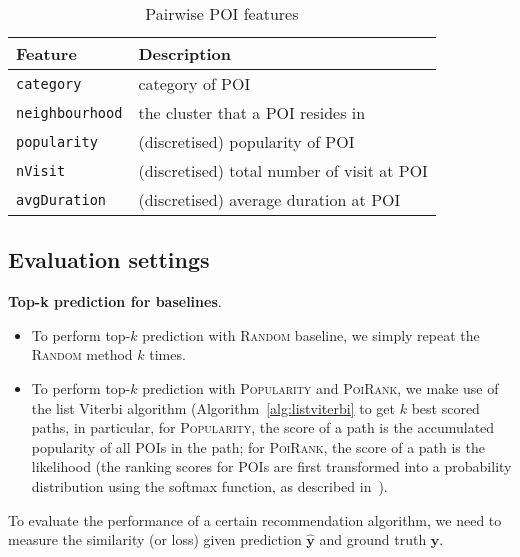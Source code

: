 \begin{table}[!h]
\caption{Pairwise POI features}
\label{tab:tranfeature}
\centering
\small
\setlength{\tabcolsep}{2pt} %
\begin{tabular}{l|l} \hline
\textbf{Feature}       & \textbf{Description} \\ \hline
\texttt{category}      & category of POI \\
\texttt{neighbourhood} & the cluster that a POI resides in \\
\texttt{popularity}    & (discretised) popularity of POI \\
\texttt{nVisit}        & (discretised) total number of visit at POI \\
\texttt{avgDuration}  & (discretised) average duration at POI \\ \hline
\end{tabular}
\end{table}


\clearpage
\subsection{Evaluation settings}
\label{sec:metric}

\textbf{Top-k prediction for baselines}.
\begin{itemize}
\item To perform top-$k$ prediction with \textsc{Random} baseline, we simply repeat the \textsc{Random} method $k$ times.
\item To perform top-$k$ prediction with \textsc{Popularity} and \textsc{PoiRank}, we make use of the list Viterbi algorithm 
      (Algorithm~\ref{alg:listviterbi} to get $k$ best scored paths, in particular, 
      for \textsc{Popularity}, the score of a path is the accumulated popularity of all POIs in the path; 
      for \textsc{PoiRank}, the score of a path is the likelihood 
      (the ranking scores for POIs are first transformed into a probability distribution using the softmax function, as described in~\cite{cikm16paper}).
\end{itemize}

To evaluate the performance of a certain recommendation algorithm,
we need to measure the similarity (or loss) given prediction $\hat{\mathbf{y}}$
and ground truth $\mathbf{y}$.


